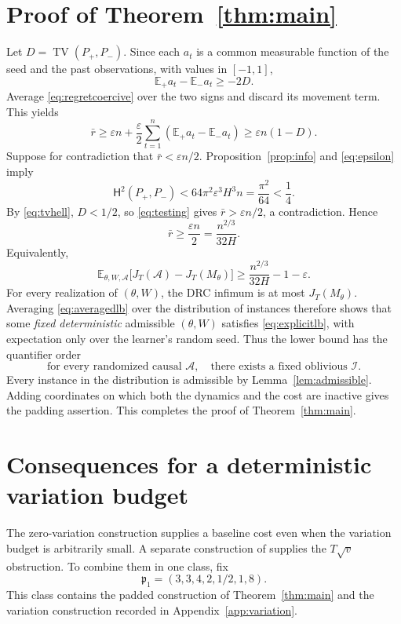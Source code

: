 \documentclass[11pt]{article}
\theoremstyle{remark}
\newcommand{\E}{\mathbb E}
\newcommand{\TV}{\operatorname{TV}}
\newcommand{\HH}{\mathsf H}
\begin{document}
\section{Proof of Theorem~\ref{thm:main}}\label{sec:finish}

Let $D=\TV(P_+,P_-)$. Since each $a_t$ is a common measurable function of the seed and the past observations, with values in $[-1,1]$,
\[
 \E_+a_t-\E_-a_t\ge-2D.
\]
Average \eqref{eq:regretcoercive} over the two signs and discard its movement term. This yields
\begin{equation}\label{eq:testing}
 \bar r
 \ge\varepsilon n+\frac\varepsilon2\sum_{t=1}^n
       (\E_+a_t-\E_-a_t)
 \ge\varepsilon n(1-D).
\end{equation}
Suppose for contradiction that $\bar r<\varepsilon n/2$. Proposition~\ref{prop:info} and \eqref{eq:epsilon} imply
\[
 \HH^2(P_+,P_-)
 <64\pi^2\varepsilon^3H^3n
 =\frac{\pi^2}{64}<\frac14.
\]
By \eqref{eq:tvhell}, $D<1/2$, so \eqref{eq:testing} gives $\bar r>\varepsilon n/2$, a contradiction. Hence
\[
 \bar r\ge\frac{\varepsilon n}{2}=
 \frac{n^{2/3}}{32H}.
\]
Equivalently,
\begin{equation}\label{eq:averagedlb}
 \E_{\theta,W,\mathcal A}\bigl[J_T(\mathcal A)-J_T(M_\theta)\bigr]
 \ge\frac{n^{2/3}}{32H}-1-\varepsilon.
\end{equation}
For every realization of $(\theta,W)$, the DRC infimum is at most $J_T(M_\theta)$. Averaging \eqref{eq:averagedlb} over the distribution of instances therefore shows that some \emph{fixed deterministic} admissible $(\theta,W)$ satisfies \eqref{eq:explicitlb}, with expectation only over the learner's random seed. Thus the lower bound has the quantifier order
\[
 \text{for every randomized causal }\mathcal A,
 \quad\text{there exists a fixed oblivious }\mathcal I.
\]
Every instance in the distribution is admissible by Lemma~\ref{lem:admissible}. Adding coordinates on which both the dynamics and the cost are inactive gives the padding assertion. This completes the proof of Theorem~\ref{thm:main}.

\section{Consequences for a deterministic variation budget}\label{sec:variation}

The zero-variation construction supplies a baseline cost even when the
variation budget is arbitrarily small. A separate construction of
\citet[Theorem~3.1 and Appendix~F.2]{minasyan} supplies the
$T\sqrt v$ obstruction. To combine them in one class, fix
\begin{equation}\label{eq:parameters1}
 \mathfrak p_1=(3,3,4,2,1/2,1,8).
\end{equation}
This class contains the padded construction of Theorem~\ref{thm:main}
and the variation construction recorded in Appendix~\ref{app:variation}.
\end{document}
